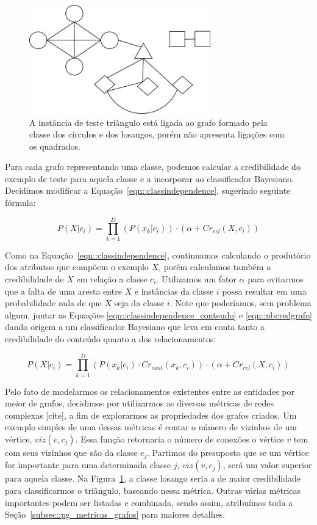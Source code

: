 \begin{figure}[ht!]
\centering
\includegraphics[width=0.7\textwidth]{figures/grafo.png}
\caption{A instância de teste triângulo está ligada ao grafo formado pela classe dos círculos e dos losangos, porém não apresenta ligações com os quadrados.}
\label{fig::grafo}
\end{figure}

Para cada grafo representando uma classe, podemos calcular a credibilidade do exemplo de teste para aquela classe e a incorporar ao classificador Bayesiano. Decidimos modificar a Equação~\ref{eqn::classindependence}, sugerindo seguinte fórmula:

\begin{equation}\label{eqn::nbcredgrafo}
P(X|c_{i}) = \prod^{D}_{k=1}{(P(x_k|c_i)) \cdot (\alpha + Cr_{rel}(X,c_i)) } 
\end{equation}

Como na Equação~\ref{eqn::classindependence}, continuamos calculando o produtório dos atributos que compõem o exemplo $X$, porém calculamos também a credibilidade de $X$ em relação a classe $c_i$. Utilizamos um fator $\alpha$ para evitarmos que a falta de uma aresta entre $X$ e instâncias da classe $i$ possa resultar em uma probabilidade nula de que $X$ seja da classe $i$. Note que poderíamos, sem problema algum, juntar as Equações \ref{eqn::classindependence_conteudo} e \ref{eqn::nbcredgrafo} dando origem a um classificador Bayesiano que leva em conta tanto a credibilidade do conteúdo quanto a dos relacionamentos:

\begin{equation}\label{eqn::nbcredcompleta}
P(X|c_{i}) = \prod^{D}_{k=1}{(P(x_k|c_i) \cdot Cr_{cont}(x_k,c_i)) \cdot (\alpha + Cr_{rel}(X,c_i)) } 
\end{equation}


Pelo fato de modelarmos os relacionamentos existentes entre as entidades por meior de grafos, decidimos por utilizarmos as diversas métricas de redes complexas [cite], a fim de explorarmos as propriedades dos grafos criados. Um exemplo simples de uma dessas métricas é contar o número de vizinhos de um vértice, $viz(v,c_j)$. Essa função retornaria o número de conexões o vértice $v$ tem com seus vizinhos que são da classe $c_j$. Partimos do presuposto que se um vértice for importante para uma determinada classe $j$, $viz(v,c_j)$, será um valor superior para aquela classe. Na Figura~\ref{fig::grafo}, a classe losango seria a de maior credibilidade para classificarmos o triângulo, baseando nessa métrica. Outras várias métricas importantes podem ser listadas e combinada, sendo assim, atribuímos toda a Seção~\ref{subsec::pg_metricas_grafos} para maiores detalhes.  


